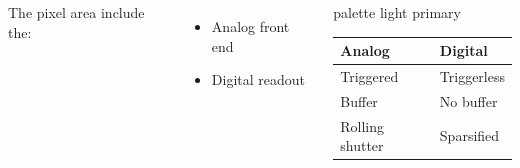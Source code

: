 \begin{frame}
            \begin{columns}
                    The pixel area include the:
                    \begin{itemize}
                        \item Analog front end
                        \item Digital readout 
                    \end{itemize} 
                    \vspace*{-0.15cm}%
                    \begin{beamercolorbox}[rounded=true, center]{palette light primary}
                        \setlength{\tabcolsep}{0.5em} %
                        {\renewcommand{\arraystretch}{1.2}%
                        \begin{tabular}{l|l}
                            Analog & Digital\\
                            \hline
                            Triggered & Triggerless\\
                            \hline
                            Buffer & No buffer \\
                            \hline
                            Rolling shutter & Sparsified\\
                        \end{tabular}
                        }
                    \end{beamercolorbox}
            \end{columns}
    \end{frame} 




